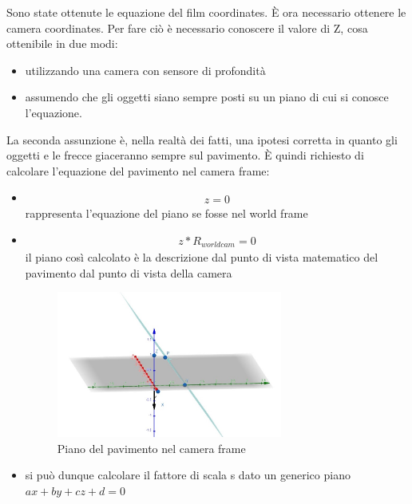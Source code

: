Sono state ottenute le equazione del film coordinates. È ora necessario ottenere le camera coordinates. Per fare ciò è necessario conoscere il valore di Z, cosa ottenibile in due modi:
\begin{itemize}
	\item \textbf{} utilizzando una camera con sensore di profondità
	\item \textbf{} assumendo che gli oggetti siano sempre posti su un piano di cui si conosce l'equazione.
\end{itemize}
La seconda assunzione è, nella realtà dei fatti, una ipotesi corretta in quanto gli oggetti e le frecce giaceranno sempre sul pavimento.
È quindi richiesto di calcolare l'equazione del pavimento nel camera frame:
\begin{itemize}
	\item \textbf{}
		\begin{equation}
			\begin{split}
			z = 0
			\end{split}
		\end{equation}
		rappresenta l'equazione del piano se fosse nel world frame
	\item \textbf{}
		\begin{equation}
		\begin{split}
		z*R_{worldcam} = 0
		\end{split}
		\end{equation}
		il piano così calcolato è la descrizione dal punto di vista matematico del pavimento dal punto di vista della camera
	\begin{figure}[H]
		\centering
		\includegraphics[width=0.7\textwidth]{Immagini/piano_camera.jpeg}
		\caption{Piano del pavimento nel camera frame}
		\label{fig:piano_camera}
	\end{figure}
	\item \textbf{}
	si può dunque calcolare il fattore di scala s dato un generico piano $ax+by+cz+d=0$

\end{itemize}
